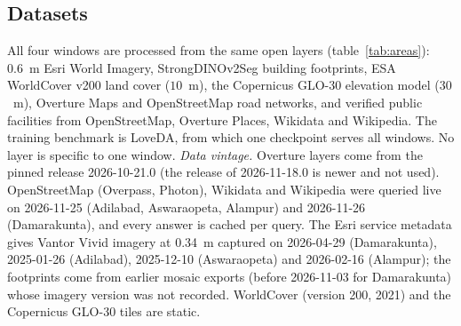 \documentclass[preprint,12pt]{elsarticle}
\newcommand{\dinoseg}{StrongDINOv2Seg}
\begin{document}
\subsection{Datasets}
All four windows are processed from the same open layers (table~\ref{tab:areas}): 0.6~m Esri World Imagery, \dinoseg{} building footprints, ESA WorldCover v200 land cover ($10$~m), the Copernicus GLO-30 elevation model ($30$~m), Overture Maps and OpenStreetMap road networks, and verified public facilities from OpenStreetMap, Overture Places, Wikidata \cite{vrandecic2014wikidata} and Wikipedia. The training benchmark is LoveDA, from which one checkpoint serves all windows. No layer is specific to one window. \emph{Data vintage.} Overture layers come from the pinned release 2026-10-21.0 (the release of 2026-11-18.0 is newer and not used). OpenStreetMap (Overpass, Photon), Wikidata and Wikipedia were queried live on 2026-11-25 (Adilabad, Aswaraopeta, Alampur) and 2026-11-26 (Damarakunta), and every answer is cached per query. The Esri service metadata gives Vantor Vivid imagery at 0.34~m captured on 2026-04-29 (Damarakunta), 2025-01-26 (Adilabad), 2025-12-10 (Aswaraopeta) and 2026-02-16 (Alampur); the footprints come from earlier mosaic exports (before 2026-11-03 for Damarakunta) whose imagery version was not recorded. WorldCover (version 200, 2021) and the Copernicus GLO-30 tiles are static.
\end{document}
